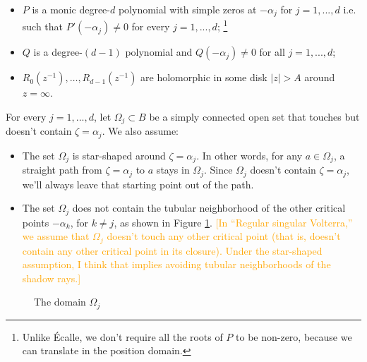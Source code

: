\documentclass{article}
\theoremstyle{definition}
\theoremstyle{plain}
\begin{document}
\begin{itemize}
\item $P$ is a monic degree-$d$ polynomial with simple zeros at $-\alpha_j$ for $j=1,...,d$ i.e. such that $P'(-\alpha_j)\neq 0$ for every $j=1,...,d$; \footnote{Unlike \'Ecalle, we don't require all the roots of $P$ to be non-zero, because  we can translate in the position domain.}
\item $Q$ is a degree-$(d-1)$ polynomial and $Q(-\alpha_j)\neq 0$ for all $j=1,...,d$;
\item $R_0(z^{-1}), \ldots, R_{d-1}(z^{-1})$ are holomorphic in some disk $|z| > A$ around $z = \infty$.
\end{itemize}

For every $j=1,...,d$, let $\Omega_j\subset B$ be a simply connected open set that touches but doesn't contain $\zeta = \alpha_j$. We also assume:
\begin{itemize}
\item The set $\Omega_j$ is star-shaped around $\zeta = \alpha_j$. In other words, for any $a \in \Omega_j$, a straight path from $\zeta = \alpha_j$ to $a$ stays in $\Omega_j$. Since $\Omega_j$ doesn't contain $\zeta = \alpha_j$, we'll always leave that starting point out of the path.
\item The set $\Omega_j$ does not contain the tubular neighborhood of the other critical points $-\alpha_k$, for $k\neq j$, as shown in Figure \ref{Fig:domain}. \textcolor{orange}{[In ``Regular singular Volterra,'' we assume that $\Omega_j$ doesn't touch any other critical point (that is, doesn't contain any other critical point in its closure). Under the star-shaped assumption, I think that implies avoiding tubular neighborhoods of the shadow rays.]}
\end{itemize}

\begin{figure}
\center
{}
\caption{The domain $\Omega_j$}\label{Fig:domain}
\end{figure}
\end{document}

